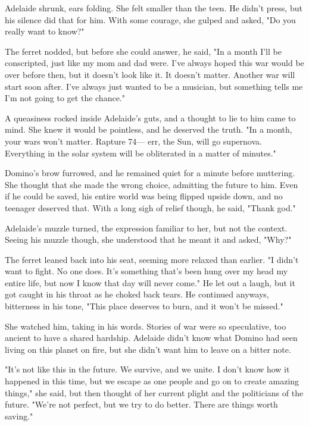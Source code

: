 Adelaide shrunk, ears folding. She felt smaller than the teen. He didn't press, but his silence did that for him. With some courage, she gulped and asked, "Do you really want to know?"

The ferret nodded, but before she could answer, he said, "In a month I'll be conscripted, just like my mom and dad were. I've always hoped this war would be over before then, but it doesn't look like it. It doesn't matter. Another war will start soon after. I've always just wanted to be a musician, but something tells me I'm not going to get the chance."

A queasiness rocked inside Adelaide's guts, and a thought to lie to him came to mind. She knew it would be pointless, and he deserved the truth. "In a month, your wars won't matter. Rapture 74--- err, the Sun, will go supernova. Everything in the solar system will be obliterated in a matter of minutes."

Domino's brow furrowed, and he remained quiet for a minute before muttering. She thought that she made the wrong choice, admitting the future to him. Even if he could be saved, his entire world was being flipped upside down, and no teenager deserved that. With a long sigh of relief though, he said, "Thank god."

Adelaide's muzzle turned, the expression familiar to her, but not the context. Seeing his muzzle though, she understood that he meant it and asked, "Why?"

The ferret leaned back into his seat, seeming more relaxed than earlier. "I didn't want to fight. No one does. It's something that's been hung over my head my entire life, but now I know that day will never come." He let out a laugh, but it got caught in his throat as he choked back tears. He continued anyways, bitterness in his tone, "This place deserves to burn, and it won't be missed."

She watched him, taking in his words. Stories of war were so speculative, too ancient to have a shared hardship. Adelaide didn't know what Domino had seen living on this planet on fire, but she didn't want him to leave on a bitter note.

"It's not like this in the future. We survive, and we unite. I don't know how it happened in this time, but we escape as one people and go on to create amazing things," she said, but then thought of her current plight and the politicians of the future. "We're not perfect, but we try to do better. There are things worth saving."

